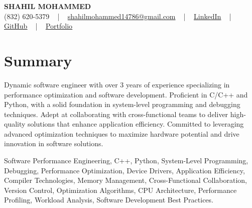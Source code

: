 \documentclass[letterpaper,10pt]{article}
\begin{document}
\begin{center}
    {\fontsize{14pt}{12pt}\selectfont \textbf{\MakeUppercase{Shahil Mohammed}}}\\ \vspace{2pt}
    \fontsize{10pt}{12pt}\selectfont (832) 620-5379 ~ | ~ \href{mailto:shahilmohammed14786@gmail.com}{shahilmohammed14786@gmail.com} ~ | ~  
    \href{https://www.linkedin.com/in/shahil-mohammed-9652931a1/}{\color{blue}\underline{LinkedIn}}  ~ | ~ 
    \href{https://github.com/freakbeast14}{\color{blue}\underline{GitHub}} ~ | ~ 
    \href{https://shahil-mohammed.netlify.app/}{\color{blue}\underline{Portfolio}}
    \vspace{-8pt}
\end{center}

\section{Summary}
\vspace{-2pt}\fontsize{8pt}{9pt}\selectfont
Dynamic software engineer with over 3 years of experience specializing in performance optimization and software development. Proficient in C/C++ and Python, with a solid foundation in system-level programming and debugging techniques. Adept at collaborating with cross-functional teams to deliver high-quality solutions that enhance application efficiency. Committed to leveraging advanced optimization techniques to maximize hardware potential and drive innovation in software solutions.
 \vspace{-5pt}
 
{\fontsize{1pt}{1pt}\selectfont\color{white}
Software Performance Engineering, C++, Python, System-Level Programming, Debugging, Performance Optimization, Device Drivers, Application Efficiency, Compiler Technologies, Memory Management, Cross-Functional Collaboration, Version Control, Optimization Algorithms, CPU Architecture, Performance Profiling, Workload Analysis, Software Development Best Practices.
}
\vspace{-8pt}

\vspace{-2pt}
\end{document}
